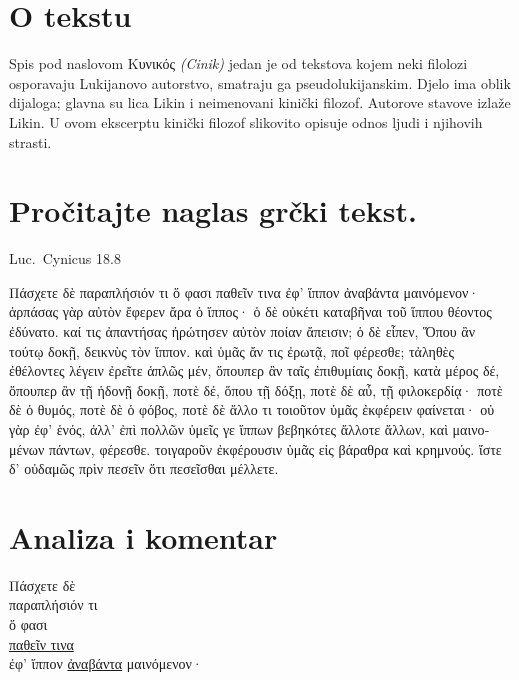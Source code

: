 
\section*{O tekstu}

Spis pod naslovom Κυνικός \textit{(Cinik)} jedan je od tekstova kojem neki filolozi osporavaju Lukijanovo autorstvo, smatraju ga pseudolukijanskim. Djelo ima oblik dijaloga; glavna su lica Likin i neimenovani kinički filozof. Autorove stavove izlaže Likin. U ovom ekscerptu kinički filozof slikovito opisuje odnos ljudi i njihovih strasti.


\section*{Pročitajte naglas grčki tekst.}
Luc.\ Cynicus 18.8


\medskip

{\large
\begin{greek}
\noindent Πάσχετε δὲ παραπλήσιόν τι ὅ φασι παθεῖν τινα ἐφ' ἵππον ἀναβάντα μαινόμενον· ἁρπάσας γὰρ αὐτὸν ἔφερεν ἄρα ὁ ἵππος· ὁ δὲ οὐκέτι καταβῆναι τοῦ ἵππου θέοντος ἐδύνατο. καί τις ἀπαντήσας ἠρώτησεν αὐτὸν ποίαν ἄπεισιν; ὁ δὲ εἶπεν, Ὅπου ἂν τούτῳ δοκῇ, δεικνὺς τὸν ἵππον. καὶ ὑμᾶς ἄν τις ἐρωτᾷ, ποῖ φέρεσθε; τἀληθὲς ἐθέλοντες λέγειν ἐρεῖτε ἁπλῶς μέν, ὅπουπερ ἂν ταῖς ἐπιθυμίαις δοκῇ, κατὰ μέρος δέ, ὅπουπερ ἂν τῇ ἡδονῇ δοκῇ, ποτὲ δέ, ὅπου τῇ δόξῃ, ποτὲ δὲ αὖ, τῇ φιλοκερδίᾳ· ποτὲ δὲ ὁ θυμός, ποτὲ δὲ ὁ φόβος, ποτὲ δὲ ἄλλο τι τοιοῦτον ὑμᾶς ἐκφέρειν φαίνεται· οὐ γὰρ  ἐφ' ἑνός, ἀλλ' ἐπὶ πολλῶν ὑμεῖς γε ἵππων βεβηκότες ἄλλοτε ἄλλων, καὶ μαινομένων πάντων, φέρεσθε. τοιγαροῦν ἐκφέρουσιν ὑμᾶς εἰς βάραθρα καὶ κρημνούς. ἴστε δ' οὐδαμῶς πρὶν πεσεῖν ὅτι πεσεῖσθαι μέλλετε.

\end{greek}

}

\section*{Analiza i komentar}



{\large
\begin{greek}
\noindent Πάσχετε δὲ \\
\tabto{2em} παραπλήσιόν τι \\
\tabto{4em} ὅ φασι \\
\tabto{6em} \underline{παθεῖν τινα} \\
\tabto{8em} ἐφ' ἵππον \underline{ἀναβάντα} μαινόμενον·\\

\end{greek}
}

